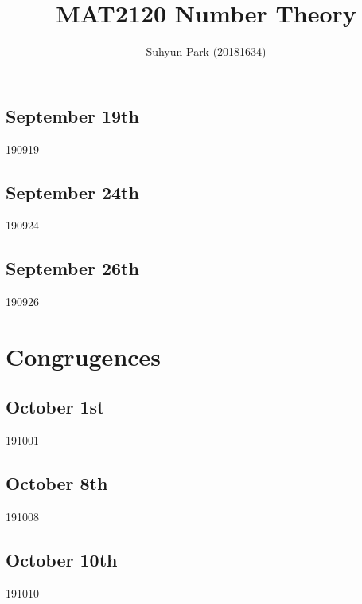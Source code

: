 



\title{MAT2120 Number Theory}
\author{Suhyun Park (20181634)}

\subsection{September 19th}
{190919}

\subsection{September 24th}
{190924}

\subsection{September 26th}
{190926}

\section{Congrugences}
\subsection{October 1st}
{191001}

\subsection{October 8th}
{191008}

\subsection{October 10th}
{191010}


